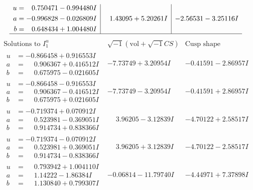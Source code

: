 \documentclass[1p]{elsarticle_modified}
\theoremstyle{definition}
\newcommand{\I}{\sqrt{-1}}
\begin{document}
$$\begin{array}{c|c|c}
\begin{aligned}
u &= \phantom{-}0.750471 - 0.994480 I \\
a &= -0.996828 - 0.026809 I \\
b &= \phantom{-}0.648434 + 1.004480 I\end{aligned}
 & \phantom{-}1.43095 + 5.20261 I & -2.56531 - 3.25116 I\\
 \hline 
 \end{array}$$\newpage$$\begin{array}{c|c|c}  
\text{Solutions to }I^u_{1}& \I (\text{vol} + \sqrt{-1}CS) & \text{Cusp shape}\\
 \hline 
\begin{aligned}
u &= -0.866458 + 0.916553 I \\
a &= \phantom{-}0.906367 + 0.416512 I \\
b &= \phantom{-}0.675975 - 0.021605 I\end{aligned}
 & -7.73749 + 3.20954 I & -0.41591 - 2.86957 I \\ \hline\begin{aligned}
u &= -0.866458 - 0.916553 I \\
a &= \phantom{-}0.906367 - 0.416512 I \\
b &= \phantom{-}0.675975 + 0.021605 I\end{aligned}
 & -7.73749 - 3.20954 I & -0.41591 + 2.86957 I \\ \hline\begin{aligned}
u &= -0.719374 + 0.070912 I \\
a &= \phantom{-}0.523981 - 0.369051 I \\
b &= \phantom{-}0.914734 + 0.838366 I\end{aligned}
 & \phantom{-}3.96205 - 3.12839 I & -4.70122 + 2.58517 I \\ \hline\begin{aligned}
u &= -0.719374 - 0.070912 I \\
a &= \phantom{-}0.523981 + 0.369051 I \\
b &= \phantom{-}0.914734 - 0.838366 I\end{aligned}
 & \phantom{-}3.96205 + 3.12839 I & -4.70122 - 2.58517 I \\ \hline\begin{aligned}
u &= \phantom{-}0.793942 + 1.004110 I \\
a &= \phantom{-}1.14222 - 1.86384 I \\
b &= \phantom{-}1.130840 + 0.799307 I\end{aligned}
 & -0.06814 - 11.79740 I & -4.44971 + 7.37898 I \\ \hline\begin{aligned}

\end{aligned}
\end{array}$$
\end{document}
